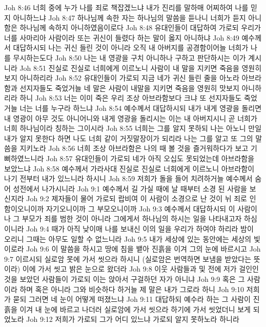Joh 8:46  너희 중에 누가 나를 죄로 책잡겠느냐 내가 진리를 말하매 어찌하여 나를 믿지 아니하느냐
Joh 8:47  하나님께 속한 자는 하나님의 말씀을 듣나니 너희가 듣지 아니함은 하나님께 속하지 아니하였음이로다
Joh 8:48  유대인들이 대답하여 가로되 우리가 너를 사마리아 사람이라 또는 귀신이 들렸다 하는 말이 옳지 아니하냐
Joh 8:49  예수께서 대답하시되 나는 귀신 들린 것이 아니라 오직 내 아버지를 공경함이어늘 너희가 나를 무시하는도다
Joh 8:50  나는 내 영광을 구치 아니하나 구하고 판단하시는 이가 계시니라
Joh 8:51  진실로 진실로 너희에게 이르노니 사람이 내 말을 지키면 죽음을 영원히 보지 아니하리라
Joh 8:52  유대인들이 가로되 지금 네가 귀신 들린 줄을 아노라 아브라함과 선지자들도 죽었거늘 네 말은 사람이 내말을 지키면 죽음을 영원히 맛보지 아니하리라 하니
Joh 8:53  너는 이미 죽은 우리 조상 아브라함보다 크냐 또 선지자들도 죽었거늘 너는 너를 누구라 하느냐
Joh 8:54  예수께서 대답하시되 내가 내게 영광을 돌리면 내 영광이 아무 것도 아니어니와 내게 영광을 돌리시는 이는 내 아버지시니 곧 너희가 너희 하나님이라 칭하는 그이시라
Joh 8:55  너희는 그를 알지 못하되 나는 아노니 만일 내가 알지 못한다 하면 나도 너희 같이 거짓말장이가 되리라 나는 그를 알고 또 그의 말씀을 지키노라
Joh 8:56  너희 조상 아브라함은 나의 때 볼 것을 즐거워하다가 보고 기뻐하였느니라
Joh 8:57  유대인들이 가로되 네가 아직 오십도 못되었는데 아브라함을 보았느냐
Joh 8:58  예수께서 가라사대 진실로 진실로 너희에게 이르노니 아브라함이 나기 전부터 내가 있느니라 하시니
Joh 8:59  저희가 돌을 들어 치려하거늘 예수께서 숨어 성전에서 나가시니라
Joh 9:1  예수께서 길 가실 때에 날 때부터 소경 된 사람을 보신지라
Joh 9:2  제자들이 물어 가로되 랍비여 이 사람이 소경으로 난 것이 뉘 죄로 인함이오니이까 자기오니이까 그 부모오니이까
Joh 9:3  예수께서 대답하시되 이 사람이나 그 부모가 죄를 범한 것이 아니라 그에게서 하나님의 하시는 일을 나타내고자 하심이니라
Joh 9:4  때가 아직 낮이매 나를 보내신 이의 일을 우리가 하여야 하리라 밤이 오리니 그때는 아무도 일할 수 없느니라
Joh 9:5  내가 세상에 있는 동안에는 세상의 빛이로라
Joh 9:6  이 말씀을 하시고 땅에 침을 뱉아 진흙을 이겨 그의 눈에 바르시고
Joh 9:7  이르시되 실로암 못에 가서 씻으라 하시니 (실로암은 번역하면 보냄을 받았다는 뜻이라) 이에 가서 씻고 밝은 눈으로 왔더라
Joh 9:8  이웃 사람들과 및 전에 저가 걸인인 것을 보았던 사람들이 가로되 이는 앉아서 구걸하던 자가 아니냐
Joh 9:9  혹은 그 사람이라 하며 혹은 아니라 그와 비슷하다 하거늘 제 말은 내가 그로라 하니
Joh 9:10  저희가 묻되 그러면 네 눈이 어떻게 떠졌느냐
Joh 9:11  대답하되 예수라 하는 그 사람이 진흙을 이겨 내 눈에 바르고 나더러 실로암에 가서 씻으라 하기에 가서 씻었더니 보게 되었노라
Joh 9:12  저희가 가로되 그가 어디 있느냐 가로되 알지 못하노라 하니라
